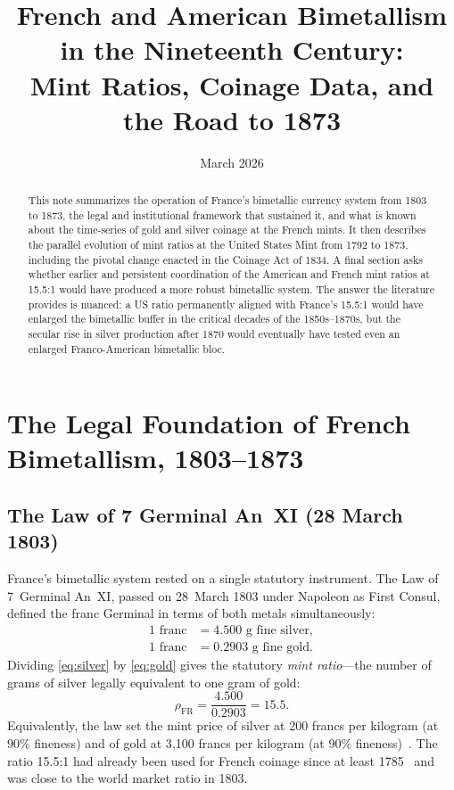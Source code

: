 \documentclass[12pt,letterpaper]{article}
\title{French and American Bimetallism in the Nineteenth Century:\\
Mint Ratios, Coinage Data, and the Road to 1873}
\author{}
\date{March 2026}
\begin{document}
\maketitle

\begin{abstract}
This note summarizes the operation of France's bimetallic currency system from 1803
to 1873, the legal and institutional framework that sustained it, and what is known
about the time-series of gold and silver coinage at the French mints.  It then
describes the parallel evolution of mint ratios at the United States Mint from 1792
to 1873, including the pivotal change enacted in the Coinage Act of 1834.  A final
section asks whether earlier and persistent coordination of the American and French
mint ratios at 15.5:1 would have produced a more robust bimetallic system.  The
answer the literature provides is nuanced: a US ratio permanently aligned with
France's 15.5:1 would have enlarged the bimetallic buffer in the critical decades of
the 1850s--1870s, but the secular rise in silver production after 1870 would
eventually have tested even an enlarged Franco-American bimetallic bloc.
\end{abstract}

\tableofcontents

\bigskip

\section{The Legal Foundation of French Bimetallism, 1803--1873}

\subsection{The Law of 7 Germinal An~XI (28 March 1803)}

France's bimetallic system rested on a single statutory instrument.  The Law of
7~Germinal An~XI, passed on 28~March 1803 under Napoleon as First Consul, defined
the franc Germinal in terms of both metals simultaneously:
\begin{align}
  1\text{ franc} &= 4.500 \text{ g fine silver}, \label{eq:silver}\\
  1\text{ franc} &= 0.2903 \text{ g fine gold}. \label{eq:gold}
\end{align}
Dividing \eqref{eq:silver} by \eqref{eq:gold} gives the statutory \emph{mint
ratio}---the number of grams of silver legally equivalent to one gram of gold:
\begin{equation}
  \rho_{\mathrm{FR}} = \frac{4.500}{0.2903} = 15.5. \label{eq:ratio}
\end{equation}
Equivalently, the law set the mint price of silver at 200 francs per kilogram
(at 90\% fineness) and of gold at 3{,}100 francs per kilogram (at 90\%
fineness)~\citep{wiegand2023}.  The ratio 15.5:1 had already been used for French
coinage since at least 1785~\citep{wikipedia_bimetallism} and was close to the
world market ratio in 1803.
\end{document}
